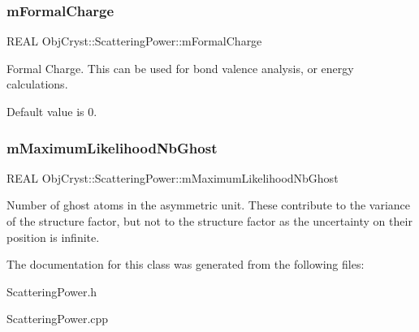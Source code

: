 \subsubsection{\texorpdfstring{mFormalCharge}{mFormalCharge}}
{\footnotesize\ttfamily R\+E\+AL Obj\+Cryst\+::\+Scattering\+Power\+::m\+Formal\+Charge\hspace{0.3cm}{\ttfamily [protected]}}

Formal Charge. This can be used for bond valence analysis, or energy calculations.

Default value is 0. \mbox{\label{class_obj_cryst_1_1_scattering_power_a53eeb0a26003df0bcf604817e2fbadf7}} 
\subsubsection{\texorpdfstring{mMaximumLikelihoodNbGhost}{mMaximumLikelihoodNbGhost}}
{\footnotesize\ttfamily R\+E\+AL Obj\+Cryst\+::\+Scattering\+Power\+::m\+Maximum\+Likelihood\+Nb\+Ghost\hspace{0.3cm}{\ttfamily [protected]}}

Number of ghost atoms in the asymmetric unit. These contribute to the variance of the structure factor, but not to the structure factor as the uncertainty on their position is infinite. 

The documentation for this class was generated from the following files\+:\begin{DoxyCompactItemize}
\item 
Scattering\+Power.\+h\item 
Scattering\+Power.\+cpp\end{DoxyCompactItemize}
